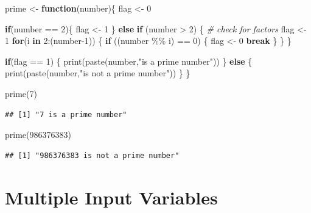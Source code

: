 \documentclass[
]{book}
\newenvironment{Shaded}{\begin{snugshade}}{\end{snugshade}}
\newcommand{\CommentTok}[1]{\textcolor[rgb]{0.56,0.35,0.01}{\textit{#1}}}
\newcommand{\ControlFlowTok}[1]{\textcolor[rgb]{0.13,0.29,0.53}{\textbf{#1}}}
\newcommand{\DecValTok}[1]{\textcolor[rgb]{0.00,0.00,0.81}{#1}}
\newcommand{\FunctionTok}[1]{\textcolor[rgb]{0.00,0.00,0.00}{#1}}
\newcommand{\NormalTok}[1]{#1}
\newcommand{\OtherTok}[1]{\textcolor[rgb]{0.56,0.35,0.01}{#1}}
\newcommand{\SpecialCharTok}[1]{\textcolor[rgb]{0.00,0.00,0.00}{#1}}
\newcommand{\StringTok}[1]{\textcolor[rgb]{0.31,0.60,0.02}{#1}}
\theoremstyle{definition}
\theoremstyle{definition}
\theoremstyle{definition}
\theoremstyle{definition}
\theoremstyle{remark}
\begin{document}
\begin{Shaded}
\begin{Highlighting}[]
\NormalTok{prime }\OtherTok{\textless{}{-}} \ControlFlowTok{function}\NormalTok{(number)\{}
\NormalTok{  flag }\OtherTok{\textless{}{-}} \DecValTok{0}
  
  \ControlFlowTok{if}\NormalTok{(number }\SpecialCharTok{==} \DecValTok{2}\NormalTok{)\{}
\NormalTok{    flag }\OtherTok{\textless{}{-}} \DecValTok{1}
\NormalTok{  \} }\ControlFlowTok{else} \ControlFlowTok{if}\NormalTok{ (number }\SpecialCharTok{\textgreater{}} \DecValTok{2}\NormalTok{) \{}
    \CommentTok{\# check for factors}
\NormalTok{    flag }\OtherTok{\textless{}{-}} \DecValTok{1}
    \ControlFlowTok{for}\NormalTok{(i }\ControlFlowTok{in} \DecValTok{2}\SpecialCharTok{:}\NormalTok{(number}\DecValTok{{-}1}\NormalTok{)) \{}
      \ControlFlowTok{if}\NormalTok{ ((number }\SpecialCharTok{\%\%}\NormalTok{ i) }\SpecialCharTok{==} \DecValTok{0}\NormalTok{) \{}
\NormalTok{        flag }\OtherTok{\textless{}{-}} \DecValTok{0}
        \ControlFlowTok{break}
\NormalTok{      \}}
\NormalTok{    \}}
\NormalTok{  \} }
  
  \ControlFlowTok{if}\NormalTok{(flag }\SpecialCharTok{==} \DecValTok{1}\NormalTok{) \{}
    \FunctionTok{print}\NormalTok{(}\FunctionTok{paste}\NormalTok{(number,}\StringTok{"is a prime number"}\NormalTok{))}
\NormalTok{  \} }\ControlFlowTok{else}\NormalTok{ \{}
    \FunctionTok{print}\NormalTok{(}\FunctionTok{paste}\NormalTok{(number,}\StringTok{"is not a prime number"}\NormalTok{))}
\NormalTok{  \}}
\NormalTok{\}}

\FunctionTok{prime}\NormalTok{(}\DecValTok{7}\NormalTok{)}
\end{Highlighting}
\end{Shaded}

\begin{verbatim}
## [1] "7 is a prime number"
\end{verbatim}

\begin{Shaded}
\begin{Highlighting}[]
\FunctionTok{prime}\NormalTok{(}\DecValTok{986376383}\NormalTok{)}
\end{Highlighting}
\end{Shaded}

\begin{verbatim}
## [1] "986376383 is not a prime number"
\end{verbatim}

\hypertarget{multiple-input-variables}{%
\section{Multiple Input Variables}\label{multiple-input-variables}}
\end{document}
